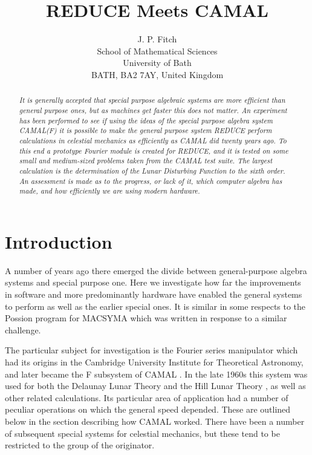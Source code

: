 \title{REDUCE Meets CAMAL}
\author{J. P. Fitch \\
School of Mathematical Sciences\\
University of Bath\\
BATH, BA2 7AY, United Kingdom}
\def\today{}
\maketitle

\begin{abstract}
{\em It is generally accepted that special purpose algebraic systems
are more efficient than general purpose ones, but as machines get
faster this does not matter.  An experiment has been performed to see
if using the ideas of the special purpose algebra system CAMAL(F) it
is possible to make the general purpose system REDUCE perform
calculations in celestial mechanics as efficiently as CAMAL did twenty
years ago.  To this end a prototype Fourier module is created for
REDUCE, and it is tested on some small and medium-sized problems taken
from the CAMAL test suite. The largest calculation is the
determination of the Lunar Disturbing Function to the sixth order.  An
assessment is made as to the progress, or lack of it, which computer
algebra has made, and how efficiently we are using modern hardware.
}
\end{abstract}

\section{Introduction}

A number of years ago there emerged the divide between general-purpose
algebra systems and special purpose one.  Here we investigate how far
the improvements in software and more predominantly hardware have
enabled the general systems to perform as well as the earlier special
ones.  It is similar in some respects to the Possion program for
MACSYMA \cite{Fateman} which was written in response to a similar
challenge.

The particular subject for investigation is the Fourier series
manipulator which had its origins in the Cambridge University
Institute for Theoretical Astronomy, and later became the F subsystem
of CAMAL \cite{Barton67b,CAMALF}.  In the late 1960s this system was
used for both the Delaunay Lunar Theory \cite{Delaunay,Barton67a} and
the Hill Lunar Theory \cite{Bourne}, as well as other related
calculations.  Its particular area of application had a number of
peculiar operations on which the general speed depended.  These are
outlined below in the section describing how CAMAL worked.  There have
been a number of subsequent special systems for celestial mechanics,
but these tend to be restricted to the group of the originator.

